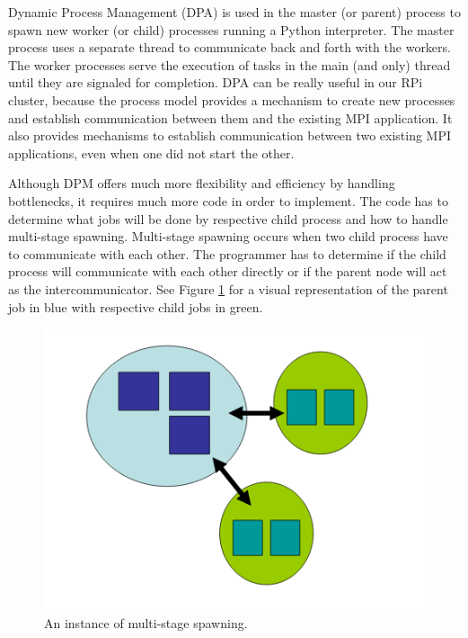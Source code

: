 	Dynamic Process Management (DPA) is used in the master (or parent) process to spawn new worker (or child) processes running a Python interpreter. The master process uses a separate thread to communicate back and forth with the workers. The worker processes serve the execution of tasks in the main (and only) thread until they are signaled for completion. DPA can be really useful in our RPi cluster, because the process model provides a mechanism to create new processes and establish communication between them and the existing MPI application. It also provides mechanisms to establish communication between two existing MPI applications, even when one did not start the other.

	Although DPM offers much more flexibility and efficiency by handling bottlenecks, it requires much more code in order to implement. The code has to determine what jobs will be done by respective child process and how to handle multi-stage spawning. Multi-stage spawning occurs when two child process have to communicate with each other. The programmer has to determine if the child process will communicate with each other directly or if the parent node will act as the intercommunicator. See Figure \ref{fig:Multi-stage} for a visual representation of the parent job in blue with respective child jobs in green.
	
\begin{figure}
\centering
\includegraphics[scale=0.7]{Figures/multi-stage}
\decoRule
\caption[Multi-stage spawning]{An instance of multi-stage spawning.}
\label{fig:Multi-stage}
\end{figure}

